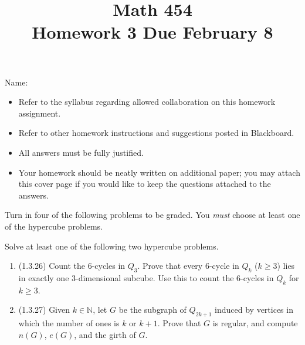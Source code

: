 \documentclass[11pt]{amsart}
\newcommand{\ceil}[1]{\left\lceil#1\right\rceil}
\begin{document}
\title{Math 454\\ Homework 3 \qquad Due February 8}
\author{}
\date{}
\maketitle
\thispagestyle{empty}

\noindent Name:~\hrulefill~~\\

\begin{itemize}
\item Refer to the syllabus regarding allowed collaboration on this homework assignment.
\item Refer to other homework instructions and suggestions posted in Blackboard.
\item All answers must be fully justified.
\item Your homework should be neatly written on additional paper; you may attach this cover page if you would like to keep the questions attached to the answers.
\end{itemize}

\bigskip

Turn in four of the following problems to be graded.  You \emph{must} choose at least one of the hypercube problems.

\bigskip

Solve at least one of the following two hypercube problems.
\begin{enumerate}[Q1]
\item (1.3.26)   Count the 6-cycles in $Q_3$.  Prove that every 6-cycle in $Q_k$ ($k\geq3$) lies in exactly one 3-dimensional subcube.  Use this to count the 6-cycles in $Q_k$ for $k\geq3$.
\item (1.3.27)   Given $k\in\mathbb{N}$, let $G$ be the subgraph of $Q_{2k+1}$ induced by vertices in which the number of ones is $k$ or $k+1$.  Prove that $G$ is regular, and compute $n(G)$, $e(G)$, and the girth of $G$.
\end{enumerate}

\bigskip

\end{document}
